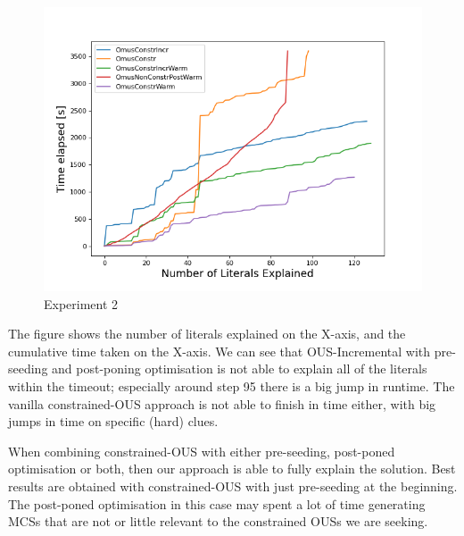 \begin{figure}[t]
    \centering
    \includegraphics[width=\columnwidth]{figures/omusConstrCumulative.png}
    \caption{Experiment 2}
    \label{fig:exp2}
\end{figure}

The figure shows the number of literals explained on the X-axis, and the cumulative time taken on the X-axis. 
We can see that OUS-Incremental with pre-seeding and post-poning optimisation is not able to explain all of the literals within the timeout; especially around step 95 there is a big jump in runtime. The vanilla constrained-OUS approach is not able to finish in time either, with big jumps in time on specific (hard) clues.

When combining constrained-OUS with either pre-seeding, post-poned optimisation or both, then our approach is able to fully explain the solution. Best results are obtained with constrained-OUS with just pre-seeding at the beginning. The post-poned optimisation in this case may spent a lot of time generating MCSs that are not or little relevant to the constrained OUSs we are seeking.

